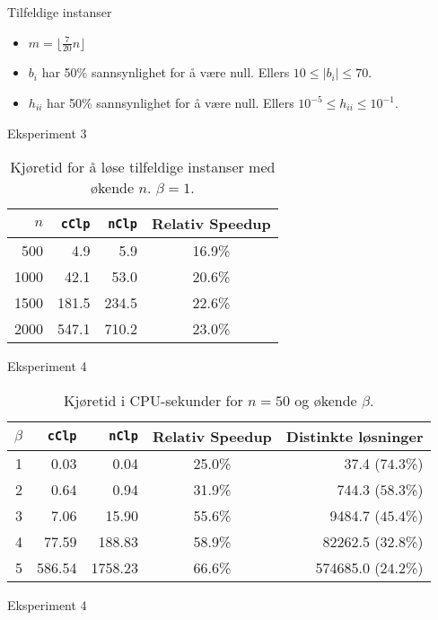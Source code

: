 \documentclass{beamer}
\begin{document}
\begin{frame}{Tilfeldige instanser}
\begin{itemize}
\item $m = \lfloor \frac{7}{20}n \rfloor$
\item $b_i$ har 50\% sannsynlighet for å være null. Ellers $10 \leq | b_i | \leq 70$.
\item $h_{ii}$ har 50\% sannsynlighet for å være null. Ellers $10^{-5} \leq h_{ii} \leq 10^{-1}$.
\end{itemize}
\end{frame}



\begin{frame}{Eksperiment 3}
\begin{table}[ht!]
    \centering
    \caption{Kjøretid for å løse tilfeldige instanser med økende $n$. $\beta = 1$.}
    \label{table:expfour}
\begin{tabular}{rrrc}
    $n$ & \texttt{cClp}  & \texttt{nClp}  & Relativ Speedup \\ \hline
    500 & 4.9   & 5.9   & 16.9\% \\
   1000 & 42.1  & 53.0  & 20.6\% \\
   1500 & 181.5 & 234.5 & 22.6\% \\
   2000 & 547.1 & 710.2 & 23.0\%
\end{tabular}
\end{table}
\end{frame}



\begin{frame}{Eksperiment 4}
\begin{table}[ht!]
\centering
\caption{Kjøretid i CPU-sekunder for $n = 50$ og økende $\beta$.}
\begin{tabular}{rrrcr}
      $\beta$ & \texttt{cClp} & \texttt{nClp} & Relativ Speedup & Distinkte løsninger\\ \hline
       1  & 0.03 & 0.04 & 25.0\% & 37.4 ($74.3$\%) \\
       2  & 0.64 & 0.94 & 31.9\% & 744.3 ($58.3$\%) \\
       3  & 7.06 & 15.90 & 55.6\% & 9484.7 ($45.4$\%) \\
       4  & 77.59 & 188.83 & 58.9\% & 82262.5 ($32.8$\%) \\
       5  & 586.54 & 1758.23 & 66.6\% & 574685.0 ($24.2$\%) \\
\end{tabular}
\label{table:exptwo}
\end{table}
\end{frame}



\begin{frame}{Eksperiment 4}

\end{frame}
\end{document}
